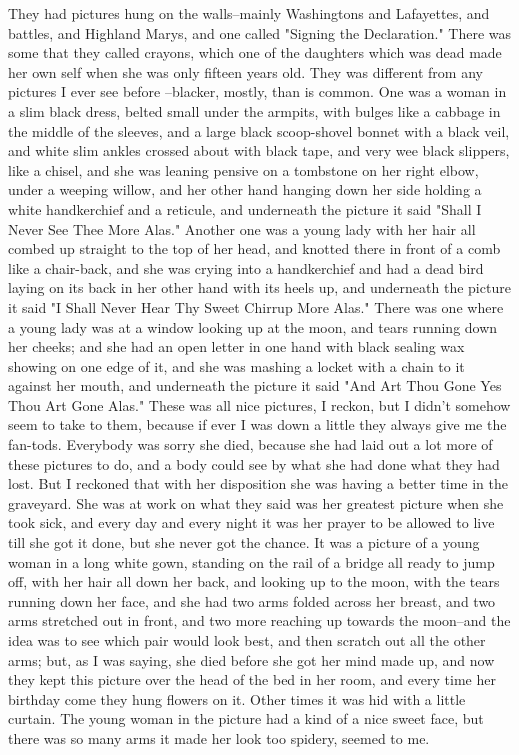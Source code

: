 They had pictures hung on the walls--mainly Washingtons and Lafayettes,
and battles, and Highland Marys, and one called "Signing the
Declaration." There was some that they called crayons, which one of the
daughters which was dead made her own self when she was only fifteen
years old.  They was different from any pictures I ever see before
--blacker, mostly, than is common.  One was a woman in a slim black dress,
belted small under the armpits, with bulges like a cabbage in the middle
of the sleeves, and a large black scoop-shovel bonnet with a black veil,
and white slim ankles crossed about with black tape, and very wee black
slippers, like a chisel, and she was leaning pensive on a tombstone on
her right elbow, under a weeping willow, and her other hand hanging down
her side holding a white handkerchief and a reticule, and underneath the
picture it said "Shall I Never See Thee More Alas."  Another one was a
young lady with her hair all combed up straight to the top of her head,
and knotted there in front of a comb like a chair-back, and she was
crying into a handkerchief and had a dead bird laying on its back in her
other hand with its heels up, and underneath the picture it said "I Shall
Never Hear Thy Sweet Chirrup More Alas."  There was one where a young
lady was at a window looking up at the moon, and tears running down her
cheeks; and she had an open letter in one hand with black sealing wax
showing on one edge of it, and she was mashing a locket with a chain to
it against her mouth, and underneath the picture it said "And Art Thou
Gone Yes Thou Art Gone Alas."  These was all nice pictures, I reckon, but
I didn't somehow seem to take to them, because if ever I was down a
little they always give me the fan-tods.  Everybody was sorry she died,
because she had laid out a lot more of these pictures to do, and a body
could see by what she had done what they had lost.  But I reckoned that
with her disposition she was having a better time in the graveyard.  She
was at work on what they said was her greatest picture when she took
sick, and every day and every night it was her prayer to be allowed to
live till she got it done, but she never got the chance.  It was a
picture of a young woman in a long white gown, standing on the rail of a
bridge all ready to jump off, with her hair all down her back, and
looking up to the moon, with the tears running down her face, and she had
two arms folded across her breast, and two arms stretched out in front,
and two more reaching up towards the moon--and the idea was to see which
pair would look best, and then scratch out all the other arms; but, as I
was saying, she died before she got her mind made up, and now they kept
this picture over the head of the bed in her room, and every time her
birthday come they hung flowers on it.  Other times it was hid with a
little curtain.  The young woman in the picture had a kind of a nice
sweet face, but there was so many arms it made her look too spidery,
seemed to me.

